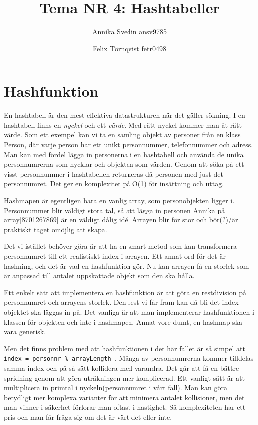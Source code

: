 \documentclass[a5paper,10pt,oneside]{article}
\title{Tema NR 4: Hashtabeller}
\author{Annika Svedin \url{ansv9785} \and Felix Törnqvist \url{fetr0498}}
\begin{document}
\maketitle
\section*{Hashfunktion}


En hashtabell är den mest effektiva datastrukturen när det gäller sökning. I en hashtabell finns en  \emph{nyckel} och ett  \emph{värde}. Med rätt nyckel kommer man åt rätt värde. Som ett exempel kan vi ta en samling objekt av personer från en klass Person, där varje person har ett unikt personnummer, telefonnummer och adress.
Man kan med fördel lägga in personerna i en hashtabell och använda de unika personnumrerna som nycklar och objekten som värden. Genom att söka på ett visst personnummer i hashtabellen returneras då personen med just det personnumret. Det ger en komplexitet på O(1) för insättning och uttag.

Hashmapen är egentligen bara en vanlig array, som personobjekten ligger i. Personnummer blir väldigt stora tal, så att lägga in personen Annika på array[8701267869] är en väldigt dålig idé. Arrayen blir för stor och bör(?)/är praktiskt taget omöjlig att skapa.

Det vi istället behöver göra är att ha en smart metod som kan transformera personnumret till ett realistiskt index i arrayen. Ett annat ord för det är hashning, och det är vad en hashfunktion gör.
Nu kan arrayen få en storlek som är anpassad till antalet uppskattade objekt som den ska hålla.

Ett enkelt sätt att implementera en hashfunktion är att göra en restdivision på personnumret och arrayens storlek. Den rest vi får fram kan då bli det index objektet ska läggas in på.
Det vanliga är att man implementerar hashfunktionen i klassen för objekten och inte i hashmapen. Annat vore dumt, en hashmap ska vara generisk.

Men det finns problem med att hashfunktionen i det här fallet är så simpel att  \texttt{index = personnr \%  arrayLength }. Många av personnumrerna kommer tilldelas samma index och på så sätt kollidera med varandra. Det går att få en bättre spridning genom att göra uträkningen mer komplicerad. Ett vanligt sätt är att multiplicera in primtal i nyckeln(personnumret i vårt fall). Man kan göra betydligt mer komplexa varianter för att minimera antalet kollisioner, men det man vinner i säkerhet förlorar man oftast i hastighet. Så komplexiteten har ett pris och man får fråga sig om det är värt det eller inte.
\end{document}
